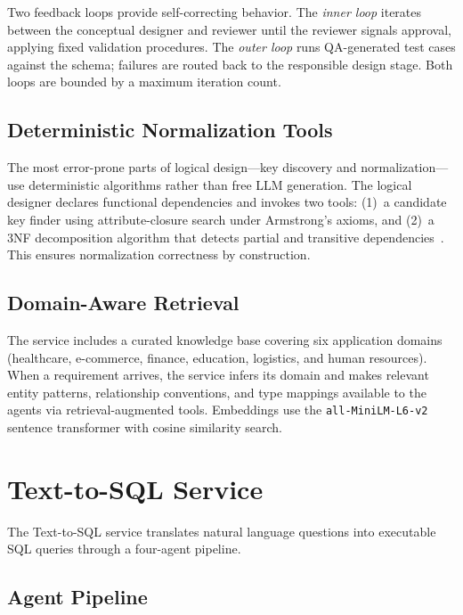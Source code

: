 \documentclass[twoside,twocolumn,10pt]{article}
\begin{document}
Two feedback loops provide self-correcting behavior. The \textit{inner loop} iterates between the conceptual designer and reviewer until the reviewer signals approval, applying fixed validation procedures. The \textit{outer loop} runs QA-generated test cases against the schema; failures are routed back to the responsible design stage. Both loops are bounded by a maximum iteration count.

\subsection{Deterministic Normalization Tools}

The most error-prone parts of logical design---key discovery and normalization---use deterministic algorithms rather than free LLM generation. The logical designer declares functional dependencies and invokes two tools: (1)~a candidate key finder using attribute-closure search under Armstrong's axioms, and (2)~a 3NF decomposition algorithm that detects partial and transitive dependencies~\cite{bernstein1976}. This ensures normalization correctness by construction.

\subsection{Domain-Aware Retrieval}

The service includes a curated knowledge base covering six application domains (healthcare, e-commerce, finance, education, logistics, and human resources). When a requirement arrives, the service infers its domain and makes relevant entity patterns, relationship conventions, and type mappings available to the agents via retrieval-augmented tools. Embeddings use the \texttt{all-MiniLM-L6-v2} sentence transformer with cosine similarity search.

\section{Text-to-SQL Service}
\fontsize{11}{13}\selectfont

The Text-to-SQL service translates natural language questions into executable SQL queries through a four-agent pipeline.

\subsection{Agent Pipeline}
\end{document}

